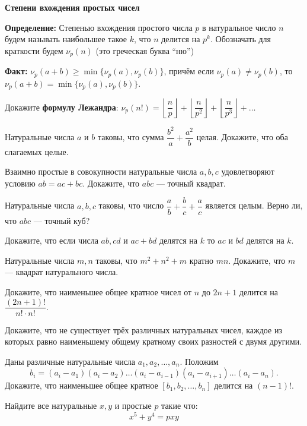 \documentclass{article}
\begin{document}
    \large

    \begin{center}
        \textbf{Степени вхождения простых чисел}
    \end{center}

    \textbf{Определение:} Степенью вхождения простого числа $p$ в натуральное число $n$ будем называть наибольшее такое $k$, что $n$ делится на $p^k$.
    Обозначать для краткости будем $\nu_p(n)$ (это греческая буква “ню”)

    \textbf{Факт:}  $\nu_p(a + b) \ge \min\{\nu_p(a),\nu_p(b)\}$, причём если $\nu_p(a) \neq \nu_p(b)$, то $\nu_p(a + b) = \min\{\nu_p (a), \nu_p (b)\}$.

    \begin{enumerate_boxed}

        \item Докажите \textbf{формулу Лежандра}: $\nu_p(n!)=\left\lfloor \dfrac{n}{p}\right\rfloor+\left\lfloor \dfrac{n}{p^2} \right\rfloor+\left\lfloor \dfrac{n}{p^3} \right\rfloor+\dotsc$

        \item Натуральные числа $a$ и $b$ таковы, что сумма $\dfrac{b^2}{a} + \dfrac{a^2}{b}$ целая.
        Докажите, что оба слагаемых целые.

        \item Взаимно простые в совокупности натуральные числа $a, b, c$ удовлетворяют условию $ab = ac + bc$.
        Докажите, что $abc$ — точный квадрат.

        \item Натуральные числа $a, b, c$ таковы, что число $\dfrac{a}{b} + \dfrac{b}{c} + \dfrac{a}{c}$ является целым.
        Верно ли, что $abc$ — точный куб?

        \item Докажите, что если числа $ab, cd$ и $ac + bd$ делятся на $k$ то $ac$ и $bd$ делятся на $k$.

        \item Натуральные числа $m, n$ таковы, что $m^2 + n^2 + m$ кратно $mn$. Докажите, что $m$ — квадрат натурального числа.

        \item Докажите, что наименьшее общее кратное чисел от $n$ до $2n + 1$ делится на $\dfrac{(2n + 1)!}{n!\cdot n!}$.

        \item Докажите, что не существует трёх различных натуральных чисел, каждое из которых равно наименьшему общему кратному своих разностей с двумя другими.

        \item Даны различные натуральные числа $a_1 , a_2 , \dotsc , a_n$.
        Положим
        \[b_i = (a_i - a_1)(a_i - a_2)\dotsc(a_i - a_{i-1})(a_i - a_{i+1})\dotsc(a_i - a_n).\]
        Докажите, что наименьшее общее кратное $[b_1 , b_2 , \dotsc , b_n ]$ делится на $(n - 1)!$.

        \item Найдите все натуральные $x, y$ и простые $p$ такие что:
        \[x^5 + y^4 = pxy\]

    \end{enumerate_boxed}
\end{document}
